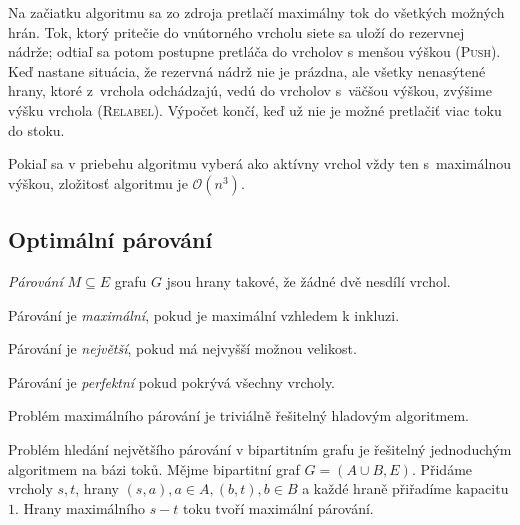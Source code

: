 Na začiatku algoritmu sa zo zdroja pretlačí maximálny tok
do všetkých možných hrán. Tok, ktorý pritečie do vnútorného vrcholu
siete sa uloží do rezervnej nádrže; odtiaľ sa potom postupne pretláča
do vrcholov s menšou výškou (\textsc{Push}). Keď nastane situácia, že 
rezervná nádrž nie je prázdna, ale všetky nenasýtené hrany, ktoré z~vrchola
odchádzajú, vedú do vrcholov s~väčšou výškou, zvýšime výšku vrchola
(\textsc{Relabel}). Výpočet končí, keď už nie je možné pretlačiť viac
toku do stoku.

Pokiaľ sa v priebehu algoritmu vyberá ako aktívny vrchol vždy ten
s~maximálnou výškou, zložitosť algoritmu je $\mathcal{O}(n^3)$.

\subsection{Optimální párování}


\begin{definition}
    {\em Párování} $M \subseteq E$ grafu $G$ jsou hrany takové, že
    žádné dvě nesdílí vrchol.

    Párování je {\em maximální}, pokud je maximální vzhledem k inkluzi.

    Párování je {\em největší}, pokud má nejvyšší možnou velikost.

    Párování je {\em perfektní} pokud pokrývá všechny vrcholy.
\end{definition}

Problém maximálního párování je triviálně řešitelný hladovým
algoritmem.

Problém hledání největšího párování v bipartitním grafu je řešitelný
jednoduchým algoritmem na bázi toků. Mějme bipartitní graf
$G = (A \cup B, E)$. Přidáme vrcholy $s, t$,
hrany $(s, a), a \in A, (b, t), b \in B$ a každé hraně přiřadíme
kapacitu $1$. Hrany maximálního $s-t$ toku tvoří maximální párování.


